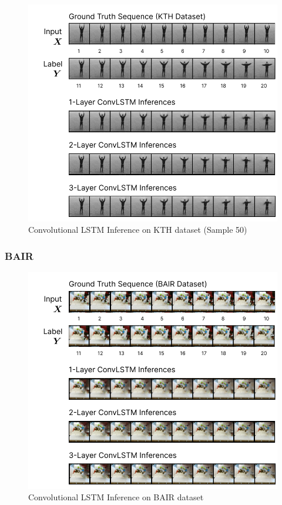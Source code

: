 \documentclass{scrartcl}
\begin{document}
\begin{figure}[H]
	\begin{center}
		\includegraphics[width=1\textwidth]{inferences/kth/kth_inferences_2.png}
	\end{center}
	\caption{Convolutional LSTM Inference on KTH dataset (Sample 50)}
	\label{inf:lstm_kth_inference}
\end{figure}


\subsubsection{BAIR}
\label{subsubsec:bair}

\begin{figure}[H]
	\begin{center}
		\includegraphics[width=1\textwidth]{inferences/bair/bair_inferences.png}
	\end{center}
	\caption{Convolutional LSTM Inference on BAIR dataset}
	\label{inf:lstm_bair_inference}
\end{figure}
\end{document}
